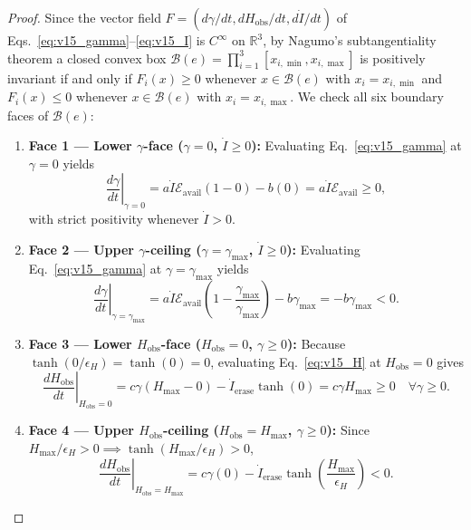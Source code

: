 \documentclass[11pt,a4paper]{article}
\theoremstyle{remark}
\begin{document}
\begin{proof}
Since the vector field $F = (d\gamma/dt, dH_{\text{obs}}/dt, d\dot{I}/dt)$ of Eqs.~\eqref{eq:v15_gamma}--\eqref{eq:v15_I} is $C^\infty$ on $\mathbb{R}^3$, by Nagumo's subtangentiality theorem a closed convex box $\mathcal{B}(e) = \prod_{i=1}^3 [x_{i,\min}, x_{i,\max}]$ is positively invariant if and only if $F_i(x) \ge 0$ whenever $x \in \mathcal{B}(e)$ with $x_i = x_{i,\min}$ and $F_i(x) \le 0$ whenever $x \in \mathcal{B}(e)$ with $x_i = x_{i,\max}$. We check all six boundary faces of $\mathcal{B}(e)$:
\begin{enumerate}
\setlength{\itemsep}{1pt}
    \item \textbf{Face 1 --- Lower $\gamma$-face ($\gamma = 0$, $\dot{I} \ge 0$):} Evaluating Eq.~\eqref{eq:v15_gamma} at $\gamma = 0$ yields
    \begin{equation}
    \left.\frac{d\gamma}{dt}\right|_{\gamma=0} = a\dot{I}\mathcal{E}_{\text{avail}}(1 - 0) - b(0) = a\dot{I}\mathcal{E}_{\text{avail}} \ge 0,
    \end{equation}
    with strict positivity whenever $\dot{I} > 0$.
    \item \textbf{Face 2 --- Upper $\gamma$-ceiling ($\gamma = \gamma_{\max}$, $\dot{I} \ge 0$):} Evaluating Eq.~\eqref{eq:v15_gamma} at $\gamma = \gamma_{\max}$ yields
    \begin{equation}
    \left.\frac{d\gamma}{dt}\right|_{\gamma=\gamma_{\max}} = a\dot{I}\mathcal{E}_{\text{avail}}\!\left(1 - \frac{\gamma_{\max}}{\gamma_{\max}}\right) - b\gamma_{\max} = -b\gamma_{\max} < 0.
    \end{equation}
    \item \textbf{Face 3 --- Lower $H_{\text{obs}}$-face ($H_{\text{obs}} = 0$, $\gamma \ge 0$):} Because $\tanh(0/\epsilon_H) = \tanh(0) = 0$, evaluating Eq.~\eqref{eq:v15_H} at $H_{\text{obs}} = 0$ gives
    \begin{equation}
    \left.\frac{dH_{\text{obs}}}{dt}\right|_{H_{\text{obs}}=0} = c\gamma(H_{\max} - 0) - \dot{I}_{\text{erase}}\tanh(0) = c\gamma H_{\max} \ge 0 \quad \forall \gamma \ge 0.
    \end{equation}
    \item \textbf{Face 4 --- Upper $H_{\text{obs}}$-ceiling ($H_{\text{obs}} = H_{\max}$, $\gamma \ge 0$):} Since $H_{\max}/\epsilon_H > 0 \implies \tanh(H_{\max}/\epsilon_H) > 0$,
    \begin{equation}
    \left.\frac{dH_{\text{obs}}}{dt}\right|_{H_{\text{obs}}=H_{\max}} = c\gamma(0) - \dot{I}_{\text{erase}}\tanh\!\left(\frac{H_{\max}}{\epsilon_H}\right) < 0.

\end{equation}
\end{enumerate}
\end{proof}
\end{document}
